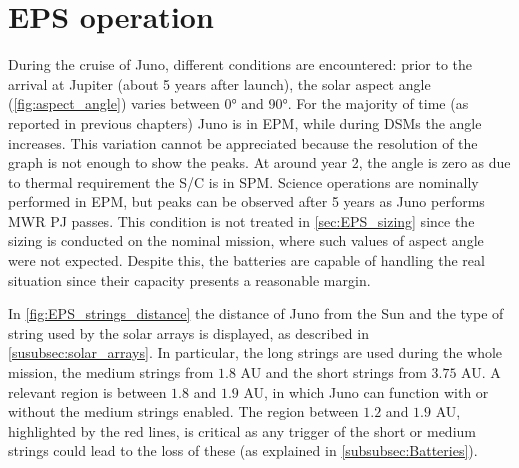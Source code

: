 \section{EPS operation}
\label{sec:eps_ops}

During the cruise of Juno, different conditions are encountered: prior to the arrival at Jupiter (about 5 years after launch), the solar aspect angle (\autoref{fig:aspect_angle}) varies between 0° and 90°.
For the majority of time (as reported in previous chapters) Juno is in EPM, while during DSMs the angle increases.
This variation cannot be appreciated because the resolution of the graph is not enough to show the peaks.
At around year 2, the angle is zero as due to thermal requirement the S/C is in SPM.
Science operations are nominally performed in EPM, but peaks can be observed after 5 years as Juno performs MWR PJ passes.
This condition is not treated in \autoref{sec:EPS_sizing} since the sizing is conducted on the nominal mission, where such values of aspect angle were not expected. Despite this, the batteries are capable of handling the real situation since their capacity presents a reasonable margin.

In \autoref{fig:EPS_strings_distance} the distance of Juno from the Sun and the type of string used by the solar arrays is displayed, as described in \autoref{susubsec:solar_arrays}.
In particular, the long strings are used during the whole mission, the medium strings from $1.8$ AU and the short strings from $3.75$ AU.
A relevant region is between $1.8$ and $1.9$ AU, in which Juno can function with or without the medium strings enabled.
The region between $1.2$ and $1.9$ AU, highlighted by the red lines, is critical as any trigger of the short or medium strings could lead to the loss of these (as explained in \autoref{subsubsec:Batteries}).

